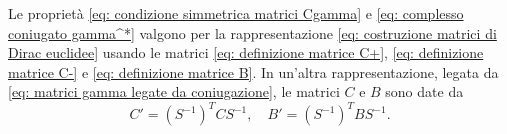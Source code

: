Le proprietà \eqref{eq: condizione simmetrica matrici Cgamma} e \eqref{eq: complesso coniugato gamma^*} valgono per la rappresentazione \eqref{eq: costruzione matrici di Dirac euclidee} usando le matrici \eqref{eq: definizione matrice C+}, \eqref{eq: definizione matrice C-} e \eqref{eq: definizione matrice B}. In un'altra rappresentazione, legata da \eqref{eq: matrici gamma legate da coniugazione}, le matrici $C$ e $B$ sono date da 
\begin{equation}
    C' = (S^{-1})^TCS^{-1},\quad B' = (S^{-1})^TBS^{-1}.
\end{equation}


